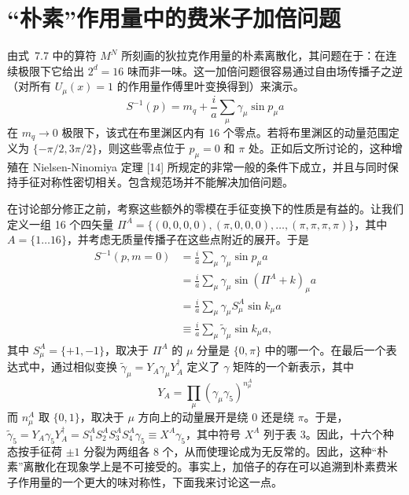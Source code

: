 \chapter{``朴素''作用量中的费米子加倍问题}

由式~7.7 中的算符 $M^N$ 所刻画的狄拉克作用量的朴素离散化，其问题在于：在连续极限下它给出 $2^d = 16$ 味而非一味。这一加倍问题很容易通过自由场传播子之逆（对所有 $U_\mu(x) = 1$ 的作用量作傅里叶变换得到）来演示。
\begin{equation}
S^{-1}(p) = m_q + \frac{i}{a}\sum_\mu \gamma_\mu \sin p_\mu a
\end{equation}
在 $m_q \to 0$ 极限下，该式在布里渊区内有 16 个零点。若将布里渊区的动量范围定义为 $\{-\pi/2, 3\pi/2\}$，则这些零点位于 $p_\mu = 0$ 和 $\pi$ 处。正如后文所讨论的，这种增殖在 Nielsen-Ninomiya 定理 [14] 所规定的非常一般的条件下成立，并且与同时保持手征对称性密切相关。包含规范场并不能解决加倍问题。

在讨论部分修正之前，考察这些额外的零模在手征变换下的性质是有益的。让我们定义一组 16 个四矢量 $\Pi^A = \{(0, 0, 0, 0), \allowbreak (\pi, 0, 0, 0), \allowbreak \ldots, \allowbreak (\pi, \pi, \pi, \pi)\}$，其中 $A = \{1 \ldots 16\}$，并考虑无质量传播子在这些点附近的展开。于是
\begin{equation}
\begin{aligned}
S^{-1}(p, m = 0) &= \frac{i}{a}\sum_\mu \gamma_\mu \sin p_\mu a \\
&= \frac{i}{a}\sum_\mu \gamma_\mu \sin(\Pi^A + k)_\mu a \\
&= \frac{i}{a}\sum_\mu \gamma_\mu S_\mu^A \sin k_\mu a \\
&\equiv \frac{i}{a}\sum_\mu \tilde{\gamma}_\mu \sin k_\mu a ,
\end{aligned}
\end{equation}
其中 $S_\mu^A = \{+1, -1\}$，取决于 $\Pi^A$ 的 $\mu$ 分量是 $\{0, \pi\}$ 中的哪一个。在最后一个表达式中，通过相似变换 $\tilde{\gamma}_\mu = Y_A \gamma_\mu Y_A^\dagger$ 定义了 $\gamma$ 矩阵的一个新表示，其中
\begin{equation}
Y_A = \prod_\mu (\gamma_\mu \gamma_5)^{n_\mu^A}
\end{equation}
而 $n_\mu^A$ 取 $\{0, 1\}$，取决于 $\mu$ 方向上的动量展开是绕 0 还是绕 $\pi$。于是，$\tilde{\gamma}_5 = Y_A \gamma_5 Y_A^\dagger =
S_1^A S_2^A S_3^A S_4^A \gamma_5 \equiv X^A \gamma_5$，其中符号 $X^A$ 列于表 3。因此，十六个种态按手征荷 $\pm 1$ 分裂为两组各 8 个，从而使理论成为无反常的。因此，这种``朴素''离散化在现象学上是不可接受的。事实上，加倍子的存在可以追溯到朴素费米子作用量的一个更大的味对称性，下面我来讨论这一点。

